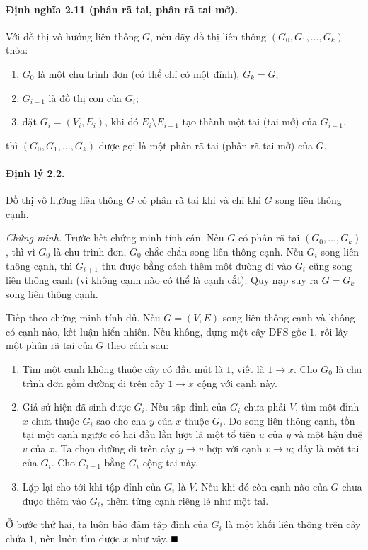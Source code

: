 \documentclass[11pt]{article}
\renewcommand{\leadsto}{\mathrel{\longrightarrow}}
\providecommand{\square}{\mathord{\vcenter{\hrule height .6em width .6em}}}
\begin{document}
\paragraph{Định nghĩa 2.11 (phân rã tai, phân rã tai mở).}
Với đồ thị vô hướng liên thông $G$, nếu dãy đồ thị liên thông
$(G_0,G_1,\ldots,G_k)$ thỏa:
\begin{enumerate}
  \item $G_0$ là một chu trình đơn (có thể chỉ có một đỉnh), $G_k=G$;
  \item $G_{i-1}$ là đồ thị con của $G_i$;
  \item đặt $G_i=(V_i,E_i)$, khi đó $E_i\setminus E_{i-1}$ tạo thành một tai
  (tai mở) của $G_{i-1}$,
\end{enumerate}
thì $(G_0,G_1,\ldots,G_k)$ được gọi là một phân rã tai (phân rã tai mở) của
$G$.

\paragraph{Định lý 2.2.}
Đồ thị vô hướng liên thông $G$ có phân rã tai khi và chỉ khi $G$ song liên thông
cạnh.

\emph{Chứng minh.}
Trước hết chứng minh tính cần. Nếu $G$ có phân rã tai $(G_0,\ldots,G_k)$, thì
vì $G_0$ là chu trình đơn, $G_0$ chắc chắn song liên thông cạnh. Nếu $G_i$ song
liên thông cạnh, thì $G_{i+1}$ thu được bằng cách thêm một đường đi vào $G_i$
cũng song liên thông cạnh (vì không cạnh nào có thể là cạnh cắt). Quy nạp suy
ra $G=G_k$ song liên thông cạnh.

Tiếp theo chứng minh tính đủ. Nếu $G=(V,E)$ song liên thông cạnh và không có
cạnh nào, kết luận hiển nhiên. Nếu không, dựng một cây DFS gốc $1$, rồi lấy một
phân rã tai của $G$ theo cách sau:
\begin{enumerate}
  \item Tìm một cạnh không thuộc cây có đầu mút là $1$, viết là $1\to x$. Cho
  $G_0$ là chu trình đơn gồm đường đi trên cây $1\leadsto x$ cộng với cạnh này.
  \item Giả sử hiện đã sinh được $G_i$. Nếu tập đỉnh của $G_i$ chưa phải $V$,
  tìm một đỉnh $x$ chưa thuộc $G_i$ sao cho cha $y$ của $x$ thuộc $G_i$. Do song
  liên thông cạnh, tồn tại một cạnh ngược có hai đầu lần lượt là một tổ tiên $u$
  của $y$ và một hậu duệ $v$ của $x$. Ta chọn đường đi trên cây $y\leadsto v$
  hợp với cạnh $v\to u$; đây là một tai của $G_i$. Cho $G_{i+1}$ bằng $G_i$ cộng
  tai này.
  \item Lặp lại cho tới khi tập đỉnh của $G_i$ là $V$. Nếu khi đó còn cạnh nào
  của $G$ chưa được thêm vào $G_i$, thêm từng cạnh riêng lẻ như một tai.
\end{enumerate}
Ở bước thứ hai, ta luôn bảo đảm tập đỉnh của $G_i$ là một khối liên thông trên
cây chứa $1$, nên luôn tìm được $x$ như vậy. \hfill$\square$
\end{document}
